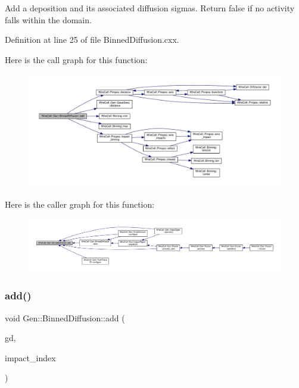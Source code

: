 Add a deposition and its associated diffusion sigmas. Return false if no activity falls within the domain. 

Definition at line 25 of file Binned\+Diffusion.\+cxx.

Here is the call graph for this function\+:
\nopagebreak
\begin{figure}[H]
\begin{center}
\leavevmode
\includegraphics[width=350pt]{class_wire_cell_1_1_gen_1_1_binned_diffusion_a9c4c6664c76ad07ad29d71bdb8fb92f1_cgraph}
\end{center}
\end{figure}
Here is the caller graph for this function\+:
\nopagebreak
\begin{figure}[H]
\begin{center}
\leavevmode
\includegraphics[width=350pt]{class_wire_cell_1_1_gen_1_1_binned_diffusion_a9c4c6664c76ad07ad29d71bdb8fb92f1_icgraph}
\end{center}
\end{figure}
\mbox{\label{class_wire_cell_1_1_gen_1_1_binned_diffusion_a61e86aee3ea24b3a56b58f8c310300d4}} 
\subsubsection{\texorpdfstring{add()}{add()}\hspace{0.1cm}{\footnotesize\ttfamily [2/2]}}
{\footnotesize\ttfamily void Gen\+::\+Binned\+Diffusion\+::add (\begin{DoxyParamCaption}\item[{std\+::shared\+\_\+ptr$<$ \hyperlink{class_wire_cell_1_1_gen_1_1_gaussian_diffusion}{Gaussian\+Diffusion} $>$}]{gd,  }\item[{int}]{impact\+\_\+index }\end{DoxyParamCaption})}

